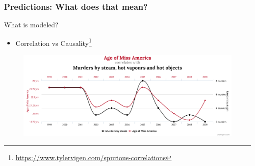 \begin{frame}\frametitle{Predictions: What does that mean?}
   What is modeled?
   \vspace{.5cm}
   \begin{itemize}
      \item Correlation vs Causality\footnote{\href{Spurious correlations site}{https://www.tylervigen.com/spurious-correlations}}
   \end{itemize}
   \begin{minipage}{0.60\linewidth}
      \begin{figure}[H]
         \includegraphics[scale=.15]{../images/illustrations/model_spurious_correlation.png}
      \end{figure}
   \end{minipage}
\end{frame}


